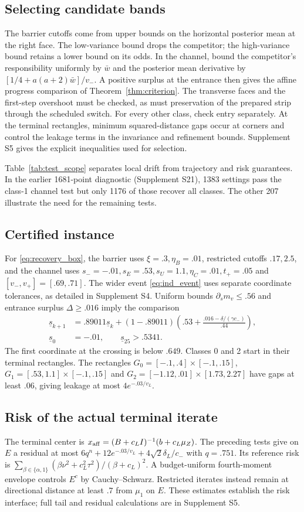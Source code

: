 \subsection{Selecting candidate bands}
The barrier cutoffs come from upper bounds on the horizontal
posterior mean at the right face. The low-variance bound drops
the competitor; the high-variance bound retains a lower bound
on its odds. In the channel, bound the competitor's responsibility
uniformly by $\bar w$ and the posterior mean derivative by
$[1/4+a(a+2)\bar w]/v_-$. A positive surplus at the entrance
then gives the affine progress comparison of
Theorem~\ref{thm:criterion}. The transverse faces and the first-step
overshoot must be checked, as must preservation of the prepared
strip through the scheduled switch. For every other class, check
entry separately. At the terminal rectangles, minimum squared-distance
gaps occur at corners and control the leakage terms in the
invariance and refinement bounds. Supplement S5 gives the
explicit inequalities used for selection.

Table~\ref{tab:test_scope} separates local drift from trajectory and risk guarantees. In the
earlier 1681-point diagnostic (Supplement S21), 1383 settings pass
the class-1 channel test but only 1176 of those recover all classes.
The other 207 illustrate the need for the remaining tests.

\subsection{Certified instance}
For \eqref{eq:recovery_box}, the barrier uses
$\xi=.3,\eta_B=.01$, restricted cutoffs $.17,2.5$, and the
channel uses $s_-=-.01,s_E=.53,s_U=1.1,\eta_C=.01,t_+=.05$
and $[v_-,v_+]=[.69,.71]$.
The wider event \eqref{eq:ind_event} uses separate coordinate
tolerances, as detailed in Supplement S4.
Uniform bounds $\partial_s m_v\le.56$ and entrance surplus
$\Delta\ge.016$ imply the comparison
\begin{align}
 \underline s_{k+1}&=.89011\underline s_k+
 (1-.89011)\left(.53+\frac{.016-\delta/(\gamma c_-)}{.44}\right),
 \nonumber\\[-2pt]
 \underline s_0&=-.01,\qquad \underline s_{25}>.5341 .
 \label{eq:main_comparison}
\end{align}
The first coordinate at the crossing is below $.649$. Classes 0 and 2 start in their
terminal rectangles. The rectangles
$G_0=[-.1,.4]\times[-.1,.15]$,
$G_1=[.53,1.1]\times[-.1,.15]$ and
$G_2=[-1.12,.01]\times[1.73,2.27]$ have gaps at least $.06$,
giving leakage at most $4e^{-.03/v_L}$.
\subsection{Risk of the actual terminal iterate}
The terminal center is
$x_{\rm aff}=(B+c_LI)^{-1}(b+c_L\mu_Z)$.
The preceding tests give on $E$ a residual at most
$6q^n+12e^{-.03/v_L}+4\sqrt2\delta_L/c_-$ with $q=.751$.
Its reference risk is
$\sum_{\beta\in\{\alpha,1\}}(\beta\nu^2+c_L^2\tau^2)/(\beta+c_L)^2$.
A budget-uniform fourth-moment envelope controls $E^c$ by
Cauchy--Schwarz. Restricted iterates instead remain at directional
distance at least $.7$ from $\mu_1$ on $E$.
These estimates establish the risk interface; full tail and
residual calculations are in Supplement S5.
